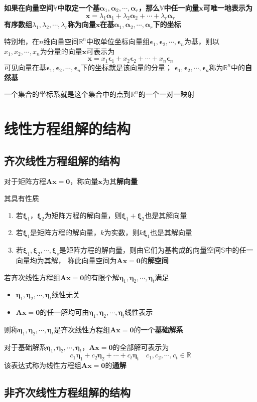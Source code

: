 \documentclass[UTF8]{ctexart}
\newcommand{\ve}[1]{{\bm{#1}}}
\newcommand{\mat}[1]{\ve{#1}}
\newcommand{\set}[1]{{\mathbb{#1}}}
\newcommand{\emplin}{\vspace{1em}}
\begin{document}
\emplin
\emplin

\textbf{如果在向量空间$\set{V}$中取定一个基$\mat{\alpha}_1,\mat{\alpha}_2,\cdots,\mat{\alpha}_r$，那么$\set{V}$中任一向量$\mat{x}$可唯一地表示为
\[\mat{x}=\lambda_1\mat{\alpha}_1+\lambda_2\mat{\alpha}_2+\cdots+\lambda_r\mat{\alpha}_r\]
有序数组$\lambda_1,\lambda_2,\cdots,\lambda_r$称为向量$\mat{x}$在基$\mat{\alpha}_1,\mat{\alpha}_2,\cdots,\mat{\alpha}_r$下的坐标}

特别地，在$n$维向量空间$\set{R}^n$中取单位坐标向量组$\mat{\epsilon}_1,\mat{\epsilon}_2,\cdots,\mat{\epsilon}_n$为基，则以
$x_1,x_2,\cdots,x_n$为分量的向量$\mat{x}$可表示为
\[\mat{x}=x_1\mat{\epsilon}_1+x_2\mat{\epsilon}_2+\cdots+x_n\mat{\epsilon}_n\]
可见向量在基$\mat{\epsilon}_1,\mat{\epsilon}_2,\cdots,\mat{\epsilon}_n$下的坐标就是该向量的分量；
$\mat{\epsilon}_1,\mat{\epsilon}_2,\cdots,\mat{\epsilon}_n$称为$\set{R}^n$中的\textbf{自然基}

一个集合的坐标系就是这个集合中的点到$\set{R}^n$的一个一对一映射

\section*{线性方程组解的结构}
\subsection*{齐次线性方程组解的结构}
对于矩阵方程$\mat{A}\mat{x}=\mat{0}$，称向量$\mat{x}$为其\textbf{解向量}

\emplin

其具有性质
\begin{enumerate}
  \item 若$\mat{\xi}_1$，$\mat{\xi}_2$为矩阵方程的解向量，则$\mat{\xi}_1+\mat{\xi}_2$也是其解向量
  \item 若$\mat{\xi}_1$是矩阵方程的解向量，$k$为实数，则$k\mat{\xi}_1$也是其解向量
  \item 若$\mat{\xi}_1,\mat{\xi}_2,\cdots,\mat{\xi}_s$是矩阵方程的解向量，则由它们为基构成的向量空间$\set{S}$中的任一向量均为其解，
  称此向量空间为$\mat{A}\mat{x}=\mat{0}$的\textbf{解空间}
\end{enumerate}

\emplin
\emplin

若齐次线性方程组$\mat{A}\mat{x}=\mat{0}$的有限个解$\mat{\eta}_1,\mat{\eta}_2,\cdots,\mat{\eta}_t$满足
\begin{itemize}
  \item $\mat{\eta}_1,\mat{\eta}_2,\cdots,\mat{\eta}_t$线性无关
  \item $\mat{A}\mat{x}=\mat{0}$的任一解均可由$\mat{\eta}_1,\mat{\eta}_2,\cdots,\mat{\eta}_t$线性表示
\end{itemize}
则称$\mat{\eta}_1,\mat{\eta}_2,\cdots,\mat{\eta}_t$是齐次线性方程组$\mat{A}\mat{x}=\mat{0}$的一个\textbf{基础解系}

\emplin
\emplin

对于基础解系$\mat{\eta}_1,\mat{\eta}_2,\cdots,\mat{\eta}_t$，$\mat{A}\mat{x}=\mat{0}$的全部解可表示为
\[c_1\mat{\eta}_1+c_2\mat{\eta}_2+\cdots+c_t\mat{\eta}_t\quad c_1,c_2,\cdots,c_t\in\set{R}\]
该表达式称为线性方程组$\mat{A}\mat{x}=\mat{0}$的\textbf{通解}

\subsection*{非齐次线性方程组解的结构}
\end{document}
